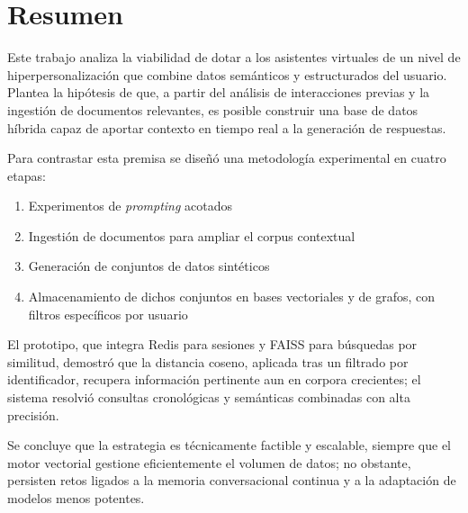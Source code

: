 \section{Resumen}

Este trabajo analiza la viabilidad de dotar a los asistentes virtuales de un nivel de hiperpersonalización que combine datos semánticos y estructurados del usuario. Plantea la hipótesis de que, a partir del análisis de interacciones previas y la ingestión de documentos relevantes, es posible construir una base de datos híbrida capaz de aportar contexto en tiempo real a la generación de respuestas.

Para contrastar esta premisa se diseñó una metodología experimental en cuatro etapas:

\begin{enumerate}
\item Experimentos de \textit{prompting} acotados
\item Ingestión de documentos para ampliar el corpus contextual
\item Generación de conjuntos de datos sintéticos
\item Almacenamiento de dichos conjuntos en bases vectoriales y de grafos, con filtros específicos por usuario
\end{enumerate}

El prototipo, que integra Redis para sesiones y FAISS para búsquedas por similitud, demostró que la distancia coseno, aplicada tras un filtrado por identificador, recupera información pertinente aun en corpora crecientes; el sistema resolvió consultas cronológicas y semánticas combinadas con alta precisión.

Se concluye que la estrategia es técnicamente factible y escalable, siempre que el motor vectorial gestione eficientemente el volumen de datos; no obstante, persisten retos ligados a la memoria conversacional continua y a la adaptación de modelos menos potentes.